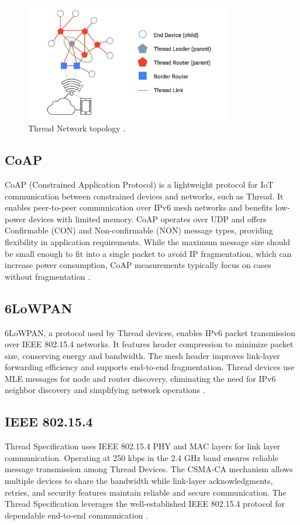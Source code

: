 \begin{figure}[!htb]
    \centering
    \includegraphics[width=0.8\textwidth]{images/situational_theoretical_analysis/thread_topology.png}
    \caption{Thread Network topology \cite{Thread_Group_Fundamentals}.}
    \label{fig:thread_topology}
\end{figure}

\subsection{CoAP}
CoAP (Constrained Application Protocol) is a lightweight protocol for IoT communication between constrained devices and networks, such as Thread. It enables peer-to-peer communication over IPv6 mesh networks and benefits low-power devices with limited memory. CoAP operates over UDP and offers Confirmable (CON) and Non-confirmable (NON) message types, providing flexibility in application requirements. While the maximum message size should be small enough to fit into a single packet to avoid IP fragmentation, which can increase power consumption, CoAP measurements typically focus on cases without fragmentation \cite{Lan_Thesis_Building_Automation_Systems}.

\subsection{6LoWPAN}
6LoWPAN, a protocol used by Thread devices, enables IPv6 packet transmission over IEEE 802.15.4 networks. It features header compression to minimize packet size, conserving energy and bandwidth. The mesh header improves link-layer forwarding efficiency and supports end-to-end fragmentation. Thread devices use MLE messages for node and router discovery, eliminating the need for IPv6 neighbor discovery and simplifying network operations \cite{Thread_Group_Fundamentals}.

\subsection{IEEE 802.15.4}
Thread Specification uses IEEE 802.15.4 PHY and MAC layers for link layer communication. Operating at 250 kbps in the 2.4 GHz band ensures reliable message transmission among Thread Devices. The CSMA-CA mechanism allows multiple devices to share the bandwidth while link-layer acknowledgments, retries, and security features maintain reliable and secure communication. The Thread Specification leverages the well-established IEEE 802.15.4 protocol for dependable end-to-end communication \cite{Thread_Group_Fundamentals}.

